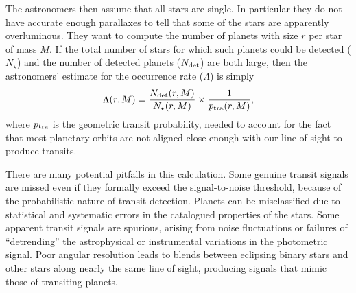 \documentclass[12pt,modern]{aastex61}
\begin{document}
The astronomers then assume that all stars are single.  In particular
they do not have accurate enough parallaxes to tell that some of the
stars are apparently overluminous. 
They want to compute the number of planets with size $r$ per star of mass $M$.
If the total number of stars for which such planets could be detected
($N_\star$) and the number of detected planets ($N_{\rm det}$) are both 
large, then the astronomers' estimate for the occurrence rate ($\Lambda$) is 
simply
\begin{equation}
\Lambda(r,M) = \frac{N_{\rm det}(r,M)}{N_\star(r,M)}
                    \times \frac{1}{p_{\rm tra}(r,M)},
\label{eq:occ_rate_simple}
\end{equation}
where $p_{\rm tra}$ is the geometric transit probability, needed to
account for the fact that most planetary orbits are not aligned close
enough with our line of sight to produce transits.

There are many potential pitfalls in this calculation.  Some genuine
transit signals are missed even if they formally exceed the
signal-to-noise threshold, because of the probabilistic nature of
transit detection.  Planets can be misclassified due to statistical
and systematic errors in the catalogued properties of the stars.  Some
apparent transit signals are spurious, arising from noise fluctuations
or failures of ``detrending'' the astrophysical or instrumental
variations in the photometric signal.  Poor angular resolution leads
to blends between eclipsing binary stars and other stars along nearly
the same line of sight, producing signals that mimic those of
transiting planets.
\end{document}
